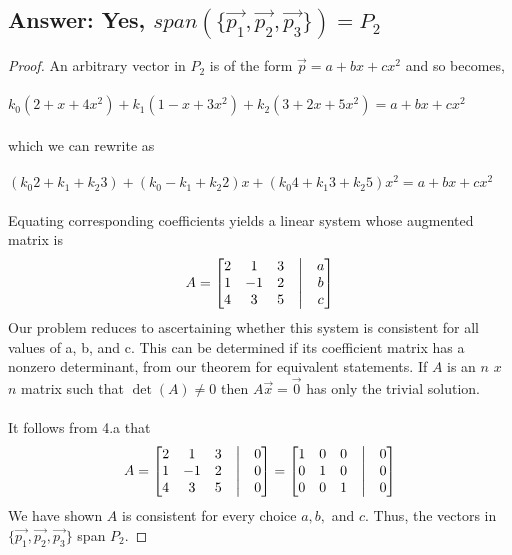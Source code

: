 \documentclass[12pt]{article}
\begin{document}
\subsection{Answer: Yes, $span(\{\vec{p_{1}},\vec{p_{2}},\vec{p_{3}}\}) = P_{2}$}
\begin{proof}
        An arbitrary vector in $P_{2}$ is of the form $\vec{p}=a+bx+cx^2$ and so becomes,\\\\
        $k_{0}(2 + x + 4x^2) +  k_{1}(1 - x + 3x^2) + k_{2}(3 + 2x + 5x^2) = a+bx+cx^2$\\\\
        which we can rewrite as \\\\
        $(k_{0}2 + k_{1} + k_{2}3) + (k_{0} - k_{1} + k_{2}2)x + (k_{0}4 + k_{1}3 + k_{2}5)x^2 = a+bx+cx^2$\\\\
        Equating corresponding coefficients yields a linear system whose augmented matrix is
        \begin{align*}
                A =
                \begin{bmatrix}
                        2 & 1  & 3 & \bigm| & a \\
                        1 & -1 & 2 & \bigm| & b \\
                        4 & 3  & 5 & \bigm| & c \\
                \end{bmatrix}
        \end{align*}
        Our problem reduces to ascertaining whether this system is consistent for
        all values of a, b, and c. This can be determined if its coefficient matrix
        has a nonzero determinant, from our theorem for equivalent statements.
        If $A$ is an $n$ $x$ $n$ matrix such that $\det(A)\neq0$ then $A\vec{x}=\vec{0}$ has only the trivial solution.\\\\
        It follows from 4.a that
        \begin{align*}
                A =
                \begin{bmatrix}
                        2 & 1  & 3 & \bigm| & 0 \\
                        1 & -1 & 2 & \bigm| & 0 \\
                        4 & 3  & 5 & \bigm| & 0 \\
                \end{bmatrix}
                =
                \begin{bmatrix}
                        1 & 0 & 0 & \bigm| & 0 \\
                        0 & 1 & 0 & \bigm| & 0 \\
                        0 & 0 & 1 & \bigm| & 0 \\
                \end{bmatrix}
        \end{align*}
        We have shown $A$ is consistent for every choice $a,b,$ and $c$.
        Thus, the vectors in $\{\vec{p_{1}},\vec{p_{2}},\vec{p_{3}}\}$ span $P_{2}$.
\end{proof}
\end{document}
